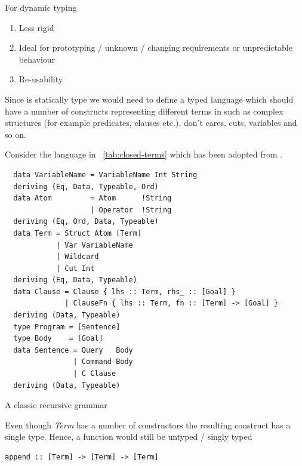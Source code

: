 \documentclass[thesis-solanki.tex]{subfiles}
\begin{document}
For dynamic typing
\begin{enumerate}
\item Less rigid
\item Ideal for prototyping / unknown / changing requirements or unpredictable behaviour
\item Re-usability
\end{enumerate}

Since  is statically type we would need to define a typed language which should have a
number of constructs representing different terms in  such as complex structures (for example
predicates, clauses etc.), don't cares, cuts, variables and so on.

Consider the language {in ~\ref{tab:closed-terms}}\yyy{}{\Large,} which has been adopted from
\cite{prolog-lib}.

\begin{code-list}
\begin{verbatim}
  data VariableName = VariableName Int String
  deriving (Eq, Data, Typeable, Ord)
  data Atom         = Atom      !String
                    | Operator  !String
  deriving (Eq, Ord, Data, Typeable)
  data Term = Struct Atom [Term]
            | Var VariableName
            | Wildcard
            | Cut Int
  deriving (Eq, Data, Typeable)
  data Clause = Clause { lhs :: Term, rhs_ :: [Goal] }
              | ClauseFn { lhs :: Term, fn :: [Term] -> [Goal] }
  deriving (Data, Typeable)
  type Program = [Sentence]
  type Body    = [Goal]
  data Sentence = Query   Body
                | Command Body
                | C Clause
  deriving (Data, Typeable)
\end{verbatim}
  \caption{A classic recursive grammar}
  \label{tab:closed-terms}
\end{code-list}

Even though \textit{Term} has a number of constructors the resulting construct has a single type.
Hence, a function would still be untyped / singly typed
\par
\begin{verbatim}
append :: [Term] -> [Term] -> [Term]
\end{verbatim}

\end{document}

